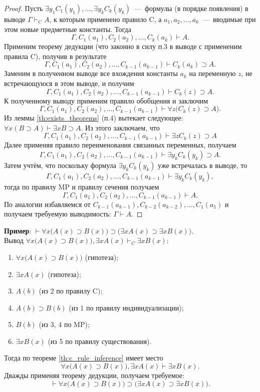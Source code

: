 \begin{proof}
    Пусть $\exists y_1C_1(y_1), \dots, \exists y_kC_k(y_k)$~---~формулы (в порядке появления) в выводе $\Gamma \vdash_C A$, к которым применено правило C, а $a_1, a_2, \dots, a_k$~---~вводимые при этом новые предметные константы. Тогда 
    \[
        \Gamma, C_1(a_1), C_2(a_2), \dots, C_k(a_k) \vdash A.
    \]
    Применим теорему дедукции (что законно в силу п.3 в выводе с примененим правила C), получив в результате 
    \[
        \Gamma, C_1(a_1), C_2(a_2), \dots, C_{k - 1}(a_{k - 1}) \vdash C_k(a_k) \supset A.
    \]
    Заменим в полученном выводе все вхождения константы $a_k$ на переменную $z$, не встречающуюся в этом выводе, и получим
    \[
        \Gamma, C_1(a_1), C_2(a_2), \dots, C_{k - 1}(a_{k - 1}) \vdash C_k(z) \supset A.
    \]
    К полученному выводу применим правило обобщения и заключим
    \[
        \Gamma, C_1(a_1), C_2(a_2), \dots, C_{k - 1}(a_{k - 1}) \vdash \forall z\big(C_k(z) \supset A\big).
    \]
    Из леммы \ref{th:exists_theorems} (п.4) вытекает следующее: $\forall x(B \supset A) \vdash \exists xB \supset A$. Из этого заключаем, что
    \[
        \Gamma, C_1(a_1), C_2(a_2), \dots, C_{k - 1}(a_{k - 1}) \vdash \exists zC_k(z) \supset A
    \]
    Далее применяя правило переименования связанных переменных, получаем
    \[
        \Gamma, C_1(a_1), C_2(a_2), \dots, C_{k - 1}(a_{k - 1}) \vdash \exists y_kC_k(y_k) \supset A.
    \]
    Затем учтём, что поскольку формула $\exists y_kC_k(y_k)$ уже встречалась в выводе, то 
    \[
        \Gamma, C_1(a_1), C_2(a_2), \dots, C_{k - 1}(a_{k - 1}) \vdash \exists y_kC_k(y_k),
    \]
    тогда по правилу MP и правилу сечения получаем
    \[
        \Gamma, C_1(a_1), C_2(a_2), \dots, C_{k - 1}(a_{k - 1}) \vdash A.
    \]
    По аналогии избавляемся от $C_{k - 1}(a_{k - 1}), C_{k - 2}(a_{k - 2}), \dots, C_1(a_1)$ и получаем требуемую выводимость: $\Gamma \vdash A$.
\end{proof}
\textbf{Пример}: $\vdash \forall x\big(A(x) \supset B(x)\big) \supset \big(\exists xA(x) \supset \exists xB(x)\big)$. \\
Вывод $\forall x\big(A(x) \supset B(x)\big), \exists xA(x) \vdash_C \exists xB(x)$:
\begin{enumerate}
    \item $\forall x\big(A(x) \supset B(x)\big)$ (гипотеза);
    \item $\exists xA(x)$ (гипотеза);
    \item $A(b)$ (из 2 по правилу C);
    \item $A(b) \supset B(b)$ (из 1 по правилу индивидуализации);
    \item $B(b)$ (из 3, 4 по MP);
    \item $\exists xB(x)$ (из 5 по правилу существования).
\end{enumerate}
Тогда по теореме \ref{th:c_rule_inference} имеет место
\[
    \forall x\big(A(x) \supset B(x)\big), \exists xA(x) \vdash \exists xB(x).
\]
Дважды применяя теорему дедукции, получаем требуемое:
\[
    \vdash \forall x\big(A(x) \supset B(x)\big) \supset \big(\exists xA(x) \supset \exists xB(x)\big).
\]